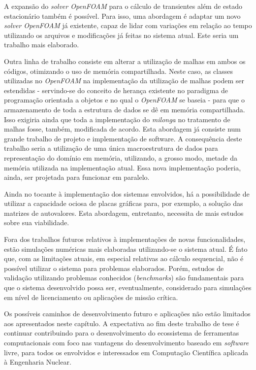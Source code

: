 A expansão do \textit{solver OpenFOAM} para o cálculo de transientes além de estado estacionário também é possível.
Para isso, uma abordagem é adaptar um novo \textit{solver OpenFOAM} já existente, capaz de lidar com variações em relação
ao tempo utilizando os arquivos e modificações já feitas no sistema atual. Este seria um trabalho mais elaborado.

Outra linha de trabalho consiste em alterar a utilização de malhas em ambos os códigos, otimizando o uso de memória
compartilhada. Neste caso, as classes utilizadas no \textit{OpenFOAM} na implementação da utilização de malhas podem
ser estendidas - servindo-se do conceito de herança existente no paradigma de programação orientada a objetos e
no qual o \textit{OpenFOAM} se baseia - para que o armazenamento de toda a estrutura de dados se dê em memória compartilhada.
Isso exigiria ainda que toda a implementação do \textit{milonga} no tratamento de malhas fosse, também, modificada de acordo.
Esta abordagem já consiste num grande trabalho de projeto e implementação de software. A consequência deste trabalho seria
a utilização de uma única macroestrutura de dados para representação do domínio em memória, utilizando, a grosso modo,
metade da memória utilizada na implementação atual. Essa nova implementação poderia, ainda, ser projetada para
funcionar em paralelo.

Ainda no tocante à implementação dos sistemas envolvidos, há a possibilidade de utilizar a capacidade ociosa de placas
gráficas para, por exemplo, a solução das matrizes de autovalores. Esta abordagem, entretanto, necessita de mais estudos
sobre sua viabilidade.

Fora dos trabalhos futuros relativos à implementações de novas funcionalidades, estão simulações numéricas mais elaboradas
utilizando-se o sistema atual. É fato que, com as limitações atuais, em especial relativas ao cálculo sequencial, não é
possível utilizar o sistema para problemas elaborados. Porém, estudos de validação utilizando problemas conhecidos
(\textit{benchmarks}) são fundamentais para que o sistema desenvolvido possa ser, eventualmente, considerado para
simulações em nível de licenciamento ou aplicações de missão crítica.

Os possíveis caminhos de desenvolvimento futuro e aplicações não estão limitados aos apresentados neste capítulo.
A expectativa ao fim deste trabalho de tese é continuar contribuindo para o desenvolvimento do ecossistema de
ferramentas computacionais com foco nas vantagens do desenvolvimento baseado em \textit{software} livre, para todos
os envolvidos e interessados em Computação Científica aplicada à Engenharia Nuclear.


